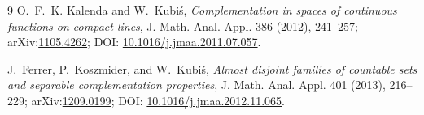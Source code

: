 \documentclass[11pt]{article}
\begin{document}
\begin{thebibliography}{9}
O.~F.~K. Kalenda and W.~Kubi\'s,
\emph{Complementation in spaces of continuous functions on compact lines},
J. Math. Anal. Appl. 386 (2012), 241--257;
arXiv:\href{https://arxiv.org/abs/1105.4262}{1105.4262};
DOI: \href{https://doi.org/10.1016/j.jmaa.2011.07.057}{10.1016/j.jmaa.2011.07.057}.

J.~Ferrer, P.~Koszmider, and W.~Kubi\'s,
\emph{Almost disjoint families of countable sets and separable complementation properties},
J. Math. Anal. Appl. 401 (2013), 216--229;
arXiv:\href{https://arxiv.org/abs/1209.0199}{1209.0199};
DOI: \href{https://doi.org/10.1016/j.jmaa.2012.11.065}{10.1016/j.jmaa.2012.11.065}.
\end{thebibliography}
\end{document}
